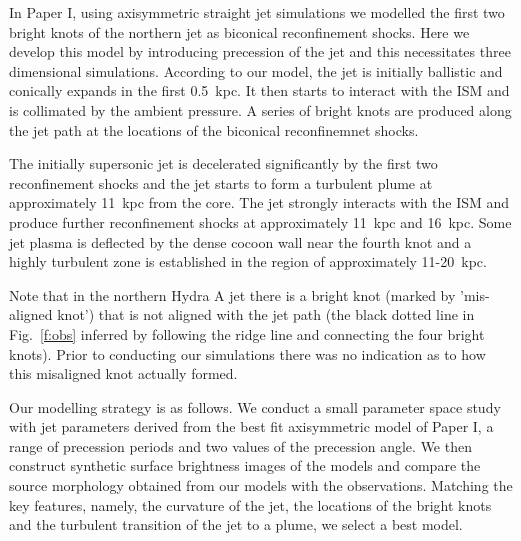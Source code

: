 \documentclass[useAMS, usenatbib]{mn2e}
\begin{document}
In Paper I, using axisymmetric straight jet simulations we modelled the first two bright knots of the northern jet as biconical reconfinement shocks. Here we develop this model by introducing precession of the jet and this necessitates three dimensional simulations.  According to our model, the jet is initially ballistic and conically expands in the first 0.5~kpc. It then starts to interact with the ISM and is collimated by the ambient pressure. A series of bright knots are produced along the jet path at the locations of the biconical reconfinemnet shocks. 

The initially supersonic jet is decelerated significantly by the first two reconfinement shocks and the jet starts to form a turbulent plume at approximately 11~kpc from the core. The jet strongly interacts with the ISM and produce further reconfinement shocks at approximately 11~kpc and 16~kpc. Some jet plasma is deflected by the dense cocoon wall near the fourth knot and a highly turbulent zone is established in the region of approximately 11-20~kpc. 

Note that in the northern Hydra A jet there is a bright knot (marked by 'mis-aligned knot') that is not aligned with the jet path (the black dotted line in Fig.~\ref{f:obs} inferred by following the ridge line and connecting the four bright knots). Prior to conducting our simulations there was no indication as to how this misaligned knot actually formed. 

Our modelling strategy is as follows. We conduct a small parameter space study with jet parameters derived from the best fit axisymmetric model of Paper I, a range of precession periods and two values of the precession angle. We then construct synthetic surface brightness images of the models and compare the source morphology obtained from our models with the observations. Matching the key features, namely, the curvature of the jet, the locations of the bright knots and the turbulent transition of the jet to a plume, we select a best model. 

%
%
\end{document}
